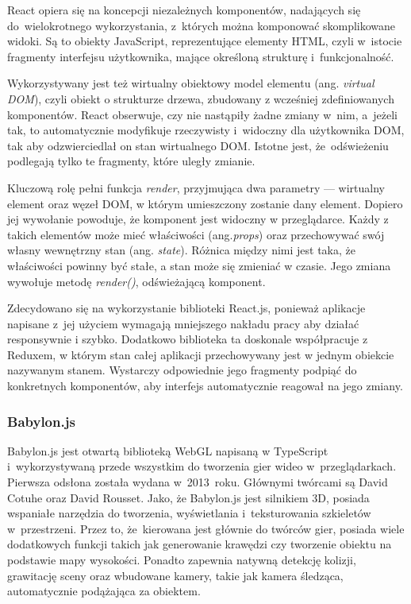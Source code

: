 \documentclass[11pt,a4paper,polish,thesis]{dcsbook}
\begin{document}
	 React opiera się na koncepcji niezależnych komponentów, nadających się do~wielokrotnego wykorzystania, z~których można komponować skomplikowane widoki. Są to obiekty JavaScript, reprezentujące elementy HTML, czyli w~istocie fragmenty interfejsu użytkownika, mające określoną strukturę i~funkcjonalność.
	 
	 Wykorzystywany jest też wirtualny obiektowy model elementu (ang. \textit{virtual DOM}), czyli obiekt o strukturze drzewa, zbudowany z wcześniej zdefiniowanych komponentów. React obserwuje, czy nie nastąpiły żadne zmiany w~nim, a~jeżeli tak, to automatycznie modyfikuje rzeczywisty i~widoczny dla użytkownika DOM, tak aby odzwierciedlał on stan wirtualnego DOM. Istotne jest, że~odświeżeniu podlegają tylko te fragmenty, które uległy zmianie.
	 
	 Kluczową rolę pełni funkcja \textit{render}, przyjmująca dwa parametry --- wirtualny element oraz węzeł DOM, w którym umieszczony zostanie dany element. Dopiero jej wywołanie powoduje, że komponent jest widoczny w przeglądarce. Każdy z takich elementów może mieć właściwości (ang.\textit{props}) oraz przechowywać swój własny wewnętrzny stan (ang. \textit{state}). Różnica między nimi jest taka, że właściwości powinny być stałe, a stan może się zmieniać w czasie. Jego zmiana wywołuje metodę \textit{render()}, odświeżającą komponent.
	
	Zdecydowano się na wykorzystanie biblioteki React.js, ponieważ aplikacje napisane z~jej użyciem wymagają mniejszego nakładu pracy aby działać responsywnie i szybko. Dodatkowo biblioteka ta doskonale współpracuje z Reduxem, w którym stan całej aplikacji przechowywany jest w jednym obiekcie nazywanym stanem. Wystarczy odpowiednie jego fragmenty podpiąć do konkretnych komponentów, aby interfejs automatycznie reagował na jego zmiany. 
		
		
	\subsubsection{Babylon.js}

	Babylon.js jest otwartą biblioteką WebGL napisaną w TypeScript i~wykorzystywaną przede wszystkim do tworzenia gier wideo w~przeglądarkach. Pierwsza odsłona została wydana w~2013~roku. Głównymi twórcami są David Cotuhe oraz David Rousset. Jako, że Babylon.js jest silnikiem 3D, posiada wspaniałe narzędzia do tworzenia, wyświetlania i~teksturowania szkieletów w~przestrzeni. Przez to, że~kierowana jest głównie do twórców gier, posiada wiele dodatkowych funkcji takich jak generowanie krawędzi czy tworzenie obiektu na podstawie mapy wysokości. Ponadto zapewnia natywną detekcję kolizji, grawitację sceny oraz wbudowane kamery, takie jak kamera śledząca, automatycznie podążająca za obiektem. 
	
\end{document}
